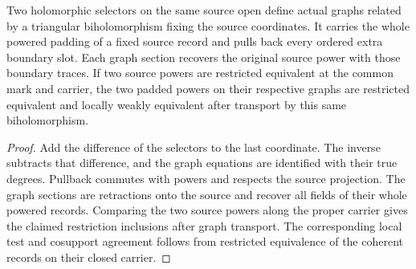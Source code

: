 \begin{theorem}
\label{hir:g1-actual-selector-graph-comparison}
\leanok
Two holomorphic selectors on the same source open define
actual graphs related by a triangular biholomorphism fixing
the source coordinates. It carries the whole powered padding
of a fixed source record and pulls back every ordered extra
boundary slot. Each graph section recovers the original
source power with those boundary traces. If two source powers
are restricted equivalent at the common mark and carrier,
the two padded powers on their respective graphs are
restricted equivalent and locally weakly equivalent after
transport by this same biholomorphism.
\end{theorem}
\begin{proof}
Add the difference of the selectors to the last coordinate.
The inverse subtracts that difference, and the graph equations
are identified with their true degrees. Pullback commutes
with powers and respects the source projection. The graph
sections are retractions onto the source and recover all
fields of their whole powered records. Comparing the two
source powers along the proper carrier gives the claimed
restriction inclusions after graph transport. The corresponding
local test and cosupport agreement follows from restricted
equivalence of the coherent records on their closed carrier.
\end{proof}

